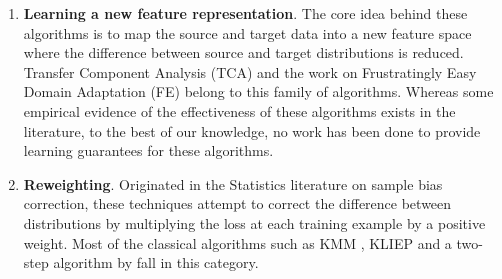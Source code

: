 \documentclass[twoside,11pt]{article}
\newcommand{\1}{\mat{1}}
\begin{document}
\begin{enumerate}
\item {\bf Learning a new feature representation}. The core idea behind
these algorithms is to map the source and target data into a new
feature space where the difference between source and target
distributions is reduced. Transfer Component Analysis (TCA)
\citep{PanTKY11} and the work on Frustratingly Easy Domain Adaptation
(FE) \citep{daume2007frustratingly} belong to this family of
algorithms. Whereas some empirical evidence of the effectiveness of
these algorithms exists in the literature, to the best of our
knowledge, no work has been done to provide learning guarantees for
these algorithms.

\item {\bf Reweighting}. Originated in the Statistics literature on
sample bias correction, these techniques attempt to correct the
difference between distributions by multiplying the loss at each
training example by a positive weight. Most of the classical
algorithms such as KMM
\citep{HuangSmolaGrettonBorgwardtScholkopf2006}, KLIEP \citep{
SugiyamaNakajimaKashimaVonBunauKawanabe2008} and a two-step algorithm
by \cite{BickelBrucknerScheffer2007} fall in this category.
\end{enumerate}
\end{document}
